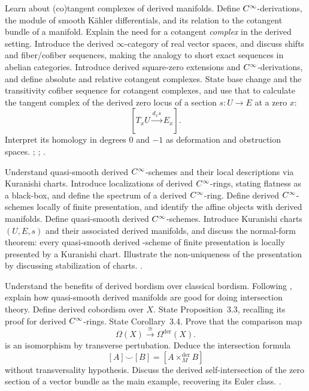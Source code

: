 \documentclass[11pt,a4paper]{book}
\begin{document}
{Learn about (co)tangent complexes of derived manifolds.}
{Define $C^\infty$-derivations, the module of smooth K\"ahler differentials, and its relation to the cotangent bundle of a manifold. Explain the need for a cotangent \emph{complex} in the derived setting. Introduce the derived $\infty$-category of real vector spaces, and discuss shifts and fiber/cofiber sequences, making the analogy to short exact sequences in abelian categories. Introduce derived square-zero extensions and $C^\infty$-derivations, and define absolute and relative cotangent complexes. State base change and the transitivity cofiber sequence for cotangent complexes, and use that to calculate the tangent complex of the derived zero locus of a section $s\colon U\to E$ at a zero $x$:
	\[
	[T_xU\xrightarrow{d_xs}E_x].
	\]
	Interpret its homology in degrees $0$ and $-1$ as deformation and obstruction spaces.}
{\textcite[Section~5]{Steffens_Derived_Differential_Geometry};
	\textcite{Pascarella_Cotangent_Complex_Derived_Differential_Geometry};
	\textcite[Section~7]{Spivak_Derived_Smooth_Manifolds}.}

{Understand quasi-smooth derived $C^\infty$-schemes and their local descriptions via Kuranishi charts.}
{Introduce localizations of derived $C^\infty$-rings, stating flatness as a black-box, and define the spectrum of a derived $C^\infty$-ring. Define derived $C^\infty$-schemes locally of finite presentation, and identify the affine objects with derived manifolds. Define quasi-smooth derived $C^\infty$-schemes. Introduce Kuranishi charts $(U,E,s)$ and their associated derived manifolds, and discuss the normal-form theorem: every quasi-smooth derived \Cinfty-scheme of finite presentation is locally presented by a Kuranishi chart. Illustrate the non-uniqueness of the presentation by discussing stabilization of charts.}
{\textcite[Chapter~1 and Sections~4.1.3 and~5.1.1]{Steffens_Derived_Differential_Geometry}.}

{Understand the benefits of derived bordism over classical bordism.}
{Following \citet{Spivak_Derived_Smooth_Manifolds}, explain how quasi-smooth derived manifolds are good for doing intersection theory. Define derived cobordism over $X$. State Proposition~3.3, recalling its proof for derived $C^\infty$-rings. State Corollary~3.4. Prove that the comparison map
	\[
	\Omega(X) \xrightarrow{\ \cong\ } \Omega^{\mathrm{der}}(X).
	\] 
	is an isomorphism by transverse pertubation. Deduce the intersection formula
	\[
	[A]\smile[B]=[A\mathbin{\times^{\mathrm{der}}_M}B]
	\]
	without transversality hypothesis. Discuss the derived self-intersection of the zero section of a vector bundle as the main example, recovering its Euler class.}
{\textcite[Sections~1--3]{Spivak_Derived_Smooth_Manifolds}.}
\end{document}
